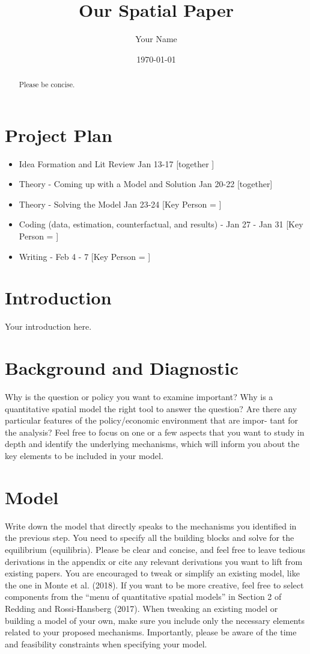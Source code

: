 \documentclass{article}
\title{Our Spatial Paper}
\author{Your Name}
\date{\today}
\begin{document}
\maketitle

\begin{abstract}
    Please be concise.
\end{abstract}

\section{Project Plan}
\begin{itemize}
    \item Idea Formation and Lit Review Jan 13-17  [together ]
    \item Theory - Coming up with a Model and Solution Jan 20-22 [together]
    \item Theory - Solving the Model Jan 23-24 [Key Person = ]
    \item Coding (data, estimation, counterfactual, and results) - Jan 27 - Jan 31  [Key Person = ]
    \item Writing -  Feb 4 - 7  [Key Person = ]
\end{itemize}

\section{Introduction}
\label{sec:intro}
Your introduction here.

\section{Background and Diagnostic}
Why is the question or policy you want to examine
important? Why is a quantitative spatial model the right tool to answer the question?
Are there any particular features of the policy/economic environment that are impor-
tant for the analysis? Feel free to focus on one or a few aspects that you want to study
in depth and identify the underlying mechanisms, which will inform you about the key
elements to be included in your model.
\section{Model}

Write down the model that directly speaks to the mechanisms you identified
in the previous step. You need to specify all the building blocks and solve for the
equilibrium (equilibria). Please be clear and concise, and feel free to leave tedious
derivations in the appendix or cite any relevant derivations you want to lift from
existing papers.
You are encouraged to tweak or simplify an existing model, like the one in Monte et
al. (2018). If you want to be more creative, feel free to select components from the
“menu of quantitative spatial models” in Section 2 of Redding and Rossi-Hansberg
(2017). When tweaking an existing model or building a model of your own, make
sure you include only the necessary elements related to your proposed mechanisms.
Importantly, please be aware of the time and feasibility constraints when specifying
your model.
\end{document}
